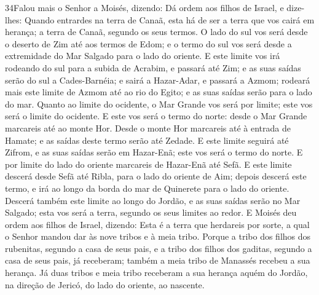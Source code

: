 \lettrine{34} Falou mais o Senhor a Moisés, dizendo: Dá
ordem aos filhos de Israel, e dize-lhes: Quando entrardes na terra
de Canaã, esta há de ser a terra que vos cairá em herança; a terra
de Canaã, segundo os seus termos. O lado do sul vos será desde o
deserto de Zim até aos termos de Edom; e o termo do sul vos será
desde a extremidade do Mar Salgado para o lado do oriente. E
este limite vos irá rodeando do sul para a subida de Acrabim, e
passará até Zim; e as suas saídas serão do sul a Cades-Barnéia; e
sairá a Hazar-Adar, e passará a Azmom; rodeará mais este limite
de Azmom até ao rio do Egito; e as suas saídas serão para o lado do
mar. Quanto ao limite do ocidente, o Mar Grande vos será por
limite; este vos será o limite do ocidente. E este vos será o
termo do norte: desde o Mar Grande marcareis até ao monte Hor.
Desde o monte Hor marcareis até à entrada de Hamate; e as saídas
deste termo serão até Zedade. E este limite seguirá até Zifrom,
e as suas saídas serão em Hazar-Enã; este vos será o termo do norte.
E por limite do lado do oriente marcareis de Hazar-Enã até
Sefã. E este limite descerá desde Sefã até Ribla, para o lado
do oriente de Aim; depois descerá este termo, e irá ao longo da
borda do mar de Quinerete para o lado do oriente. Descerá
também este limite ao longo do Jordão, e as suas saídas serão no Mar
Salgado; esta vos será a terra, segundo os seus limites ao redor.
E Moisés deu ordem aos filhos de Israel, dizendo: Esta é a
terra que herdareis por sorte, a qual o Senhor mandou dar às nove
tribos e à meia tribo. Porque a tribo dos filhos dos
rubenitas, segundo a casa de seus pais, e a tribo dos filhos dos
gaditas, segundo a casa de seus pais, já receberam; também a meia
tribo de Manassés recebeu a sua herança. Já duas tribos e
meia tribo receberam a sua herança aquém do Jordão, na direção de
Jericó, do lado do oriente, ao nascente.

